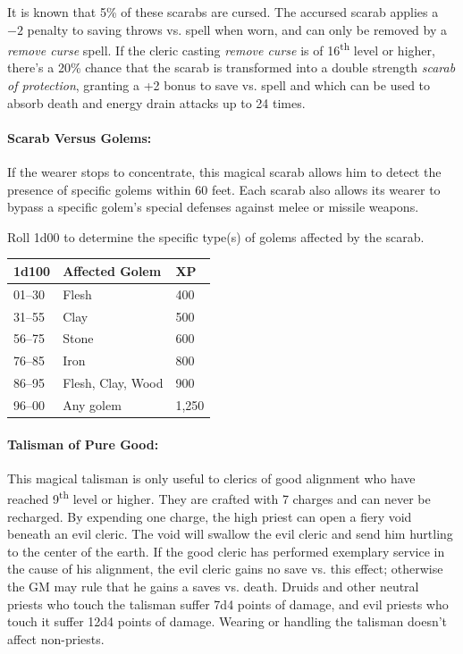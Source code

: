 \begin{multicols}{2}
It is known that 5\% of these scarabs are cursed.  The accursed scarab applies a $-2$ penalty to saving throws vs. spell when worn, and can only be removed by a \textit{remove curse} spell.  If the cleric casting \textit{remove curse} is of 16\textsuperscript{th} level or higher, there's a 20\% chance that the scarab is transformed into a double strength \textit{scarab of protection}, granting a +2 bonus to save vs. spell and which can be used to absorb death and energy drain attacks up to 24 times.

\paragraph{Scarab Versus Golems:} If the wearer stops to concentrate, this magical scarab allows him to detect the presence of specific golems within 60 feet.  Each scarab also allows its wearer to bypass a specific golem's special defenses against melee or missile weapons. 

Roll 1d00 to determine the specific type(s) of golems affected by the scarab.

\noindent
\begin{tabular}{|p{}|p{}|p{}|}
\hline
1d100	& Affected Golem	& XP \\
\hline\hline
\rowcolor[gray]{.9}01--30	& Flesh	& 400 \\
31--55	& Clay	& 500 \\
\rowcolor[gray]{.9}56--75	& Stone	& 600 \\
76--85	& Iron	& 800 \\
\rowcolor[gray]{.9}86--95	& Flesh, Clay, Wood	& 900 \\
96--00	& Any golem	& 1,250 \\
\hline
\end{tabular}

\paragraph{Talisman of Pure Good:} This magical talisman is only useful to clerics of good alignment who have reached 9\textsuperscript{th} level or higher.  They are crafted with 7 charges and can never be recharged.  By expending one charge, the high priest can open a fiery void beneath an evil cleric.  The void will swallow the evil cleric and send him hurtling to the center of the earth.  If the good cleric has performed exemplary service in the cause of his alignment, the evil cleric gains no save vs. this effect; otherwise the GM may rule that he gains a saves vs. death.  Druids and other neutral priests who touch the talisman suffer 7d4 points of damage, and evil priests who touch it suffer 12d4 points of damage.  Wearing or handling the talisman doesn't affect non-priests.


\end{multicols}
